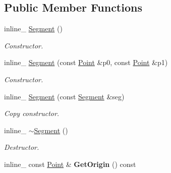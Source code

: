 \subsection*{Public Member Functions}
\begin{DoxyCompactItemize}
\item 
inline\+\_\+ \hyperlink{classOpcode_1_1Segment_a06910c1fdb6ad60a9c0335065ddea7b8}{Segment} ()\hypertarget{classOpcode_1_1Segment_a06910c1fdb6ad60a9c0335065ddea7b8}{}\label{classOpcode_1_1Segment_a06910c1fdb6ad60a9c0335065ddea7b8}

\begin{DoxyCompactList}\small\item\em Constructor. \end{DoxyCompactList}\item 
inline\+\_\+ \hyperlink{classOpcode_1_1Segment_a7e34730895f67cee4368355eea95a773}{Segment} (const \hyperlink{classOpcode_1_1Point}{Point} \&p0, const \hyperlink{classOpcode_1_1Point}{Point} \&p1)\hypertarget{classOpcode_1_1Segment_a7e34730895f67cee4368355eea95a773}{}\label{classOpcode_1_1Segment_a7e34730895f67cee4368355eea95a773}

\begin{DoxyCompactList}\small\item\em Constructor. \end{DoxyCompactList}\item 
inline\+\_\+ \hyperlink{classOpcode_1_1Segment_a3716bd223913c194e3d3a8f964ffbd75}{Segment} (const \hyperlink{classOpcode_1_1Segment}{Segment} \&seg)\hypertarget{classOpcode_1_1Segment_a3716bd223913c194e3d3a8f964ffbd75}{}\label{classOpcode_1_1Segment_a3716bd223913c194e3d3a8f964ffbd75}

\begin{DoxyCompactList}\small\item\em Copy constructor. \end{DoxyCompactList}\item 
inline\+\_\+ \hyperlink{classOpcode_1_1Segment_a5c673766756ce1cb4747b6222eeea815}{$\sim$\+Segment} ()\hypertarget{classOpcode_1_1Segment_a5c673766756ce1cb4747b6222eeea815}{}\label{classOpcode_1_1Segment_a5c673766756ce1cb4747b6222eeea815}

\begin{DoxyCompactList}\small\item\em Destructor. \end{DoxyCompactList}\item 
inline\+\_\+ const \hyperlink{classOpcode_1_1Point}{Point} \& {\bfseries Get\+Origin} () const \hypertarget{classOpcode_1_1Segment_ac9c0da39adbf64b2f68f2b3f83811900}{}\label{classOpcode_1_1Segment_ac9c0da39adbf64b2f68f2b3f83811900}


\end{DoxyCompactItemize}

